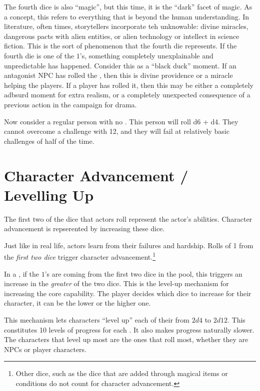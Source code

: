 The fourth dice is also ``magic'', but this time, it is the ``dark'' facet of magic.
As a concept, this refers to everything that is beyond the human understanding.
In literature, often times, storytellers incorporate teh unknowable: divine miracles, dangerous pacts with alien entities, or alien technology or intellect in science fiction.
This is the sort of phenomenon that the fourth die represents.
If the fourth die is one of the $1$'s, something completely unexplainable and unpredictable has happened.
Consider this as a ``black duck'' moment.
If an antagonist NPC has rolled the , then this is divine providence or a miracle helping the players.
If a player has rolled it, then this may be either a completely adbsurd moment for extra realism, or a completely unexpected consequence of a previous action in the campaign for drama.


\marginpar{
	\footnotesize
	
}

Now consider a regular person with no . This person will roll d6 + d4.
They cannot overcome a challenge with 12,
and they will fail at relatively basic challenges of  half of the time.

\section{Character Advancement / Levelling Up}

\label{subsec:character_advancement}

The first two of the dice that actors roll represent the actor's abilities.
Character advancement is repserented by increasing these dice.

Just like in real life, actors learn from their failures and hardship.
Rolls of 1 from the \emph{first two dice} trigger character advancement.\footnote{Other dice, such as the dice that are added through magical items or conditions do not count for character advancement.}

In a , if the $1$'s are coming from the first two dice in the pool, this
triggers an increase in the \emph{greater} of the two dice. This is the level-up mechanism
for increasing the core capability. The player decides which dice to increase for their
character, it can be the lower or the higher one.

This mechanism lets characters ``level up'' each of their  from $2d4$ to $2d12$.
This constitutes 10 levels of progress for each .
It also makes progress naturally slower.
The characters that level up most are the ones that roll most, whether they are NPCs or player characters.

